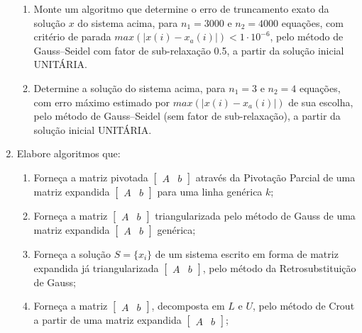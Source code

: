 \documentclass[12pt]{article}
\newenvironment{smallitem}{
    \vspace{-2mm}
    \begin{enumerate}
    \setlength{\parskip}{0pt}
    \setlength{\itemsep}{2pt}
}{
    \vspace{-2mm}
    \end{enumerate}
}
\begin{document}
\begin{enumerate}[label=\textbf{\arabic*})]
\begin{smallitem}
\item Monte um algoritmo que determine o erro de truncamento exato da solução
$x$ do sistema acima, para $n_1 = 3000$ e $n_2 = 4000$ equações, com critério de
parada $max(\vert x(i) - x_a(i) \vert) < 1 \cdot 10^{-6}$, pelo método de
Gauss--Seidel com fator de sub-relaxação 0.5, a partir da solução inicial
UNITÁRIA.

\item Determine a solução do sistema acima, para $n_1 = 3$ e $n_2 = 4$ equações,
com erro máximo estimado por $max(\vert x(i) - x_a(i) \vert)$ de sua escolha,
pelo método de Gauss--Seidel (sem fator de sub-relaxação), a partir da solução
inicial UNITÁRIA.

\end{smallitem}

\item Elabore algoritmos que:

\begin{smallitem}

\item Forneça a matriz pivotada $\begin{bmatrix} A & b \end{bmatrix}$ através da
Pivotação Parcial de uma matriz expandida $\begin{bmatrix} A & b \end{bmatrix}$
para uma linha genérica $k$;

\item Forneça a matriz $\begin{bmatrix} A & b \end{bmatrix}$ triangularizada
pelo método de Gauss de uma matriz expandida $\begin{bmatrix} A & b
\end{bmatrix}$ genérica;

\item Forneça a solução $S = \{x_i\}$ de um sistema escrito em forma de matriz
expandida já triangularizada $\begin{bmatrix} A & b \end{bmatrix}$, pelo método
da Retrosubstituição de Gauss;

\item Forneça a matriz $\begin{bmatrix} A & b \end{bmatrix}$, decomposta em $L$
e $U$, pelo método de Crout a partir de uma matriz expandida $\begin{bmatrix} A
& b \end{bmatrix}$;


\end{smallitem}
\end{enumerate}
\end{document}
